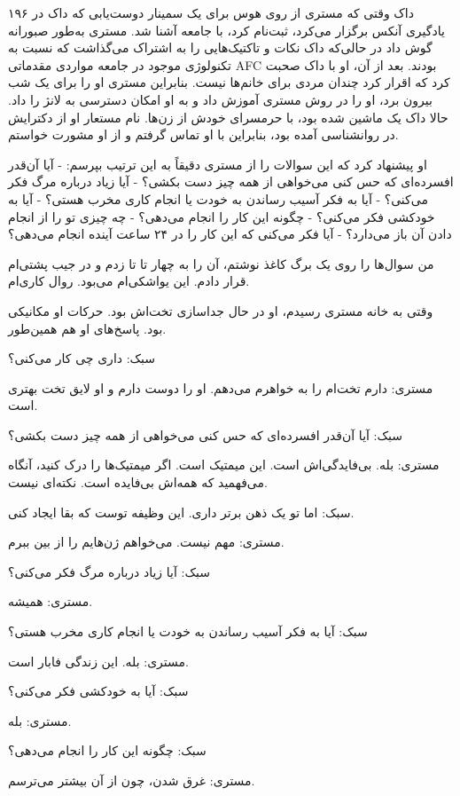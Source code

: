 ۱۹۶  
داک وقتی که مستری از روی هوس برای یک سمینار دوست‌یابی که داک در یادگیری آنکس برگزار می‌کرد، ثبت‌نام کرد، با جامعه آشنا شد. مستری به‌طور صبورانه گوش داد در حالی‌که داک نکات و تاکتیک‌هایی را به اشتراک می‌گذاشت که نسبت به تکنولوژی موجود در جامعه مواردی مقدماتی AFC بودند. بعد از آن، او با داک صحبت کرد که اقرار کرد چندان مردی برای خانم‌ها نیست. بنابراین مستری او را برای یک شب بیرون برد، او را در روش مستری آموزش داد و به او امکان دسترسی به لانژ را داد. حالا داک یک ماشین شده بود، با حرمسرای خودش از زن‌ها. نام مستعار او از دکترایش در روانشناسی آمده بود، بنابراین با او تماس گرفتم و از او مشورت خواستم.

او پیشنهاد کرد که این سوالات را از مستری دقیقاً به این ترتیب بپرسم:
- آیا آن‌قدر افسرده‌ای که حس کنی می‌خواهی از همه چیز دست بکشی؟
- آیا زیاد درباره مرگ فکر می‌کنی؟
- آیا به فکر آسیب رساندن به خودت یا انجام کاری مخرب هستی؟
- آیا به خودکشی فکر می‌کنی؟
- چگونه این کار را انجام می‌دهی؟
- چه چیزی تو را از انجام دادن آن باز می‌دارد؟
- آیا فکر می‌کنی که این کار را در ۲۴ ساعت آینده انجام می‌دهی؟

من سوال‌ها را روی یک برگ کاغذ نوشتم، آن را به چهار تا تا زدم و در جیب پشتی‌ام قرار دادم. این یواشکی‌ام می‌بود. روال کاری‌ام.

وقتی به خانه مستری رسیدم، او در حال جداسازی تخت‌اش بود. حرکات او مکانیکی بود. پاسخ‌های او هم همین‌طور.

\- سبک: داری چی کار می‌کنی؟

\- مستری: دارم تخت‌ام را به خواهرم می‌دهم. او را دوست دارم و او لایق تخت بهتری است.

\- سبک: آیا آن‌قدر افسرده‌ای که حس کنی می‌خواهی از همه چیز دست بکشی؟

\- مستری: بله. بی‌فایدگی‌اش است. این میمتیک است. اگر میمتیک‌ها را درک کنید، آنگاه می‌فهمید که همه‌اش بی‌فایده است. نکته‌ای نیست.

\- سبک: اما تو یک ذهن برتر داری. این وظیفه توست که بقا ایجاد کنی.

\- مستری: مهم نیست. می‌خواهم ژن‌هایم را از بین ببرم.

\- سبک: آیا زیاد درباره مرگ فکر می‌کنی؟

\- مستری: همیشه.

\- سبک: آیا به فکر آسیب رساندن به خودت یا انجام کاری مخرب هستی؟

\- مستری: بله. این زندگی فابار است.

\- سبک: آیا به خودکشی فکر می‌کنی؟

\- مستری: بله.

\- سبک: چگونه این کار را انجام می‌دهی؟

\- مستری: غرق شدن، چون از آن بیشتر می‌ترسم.

